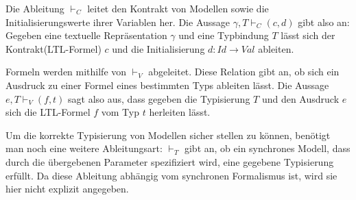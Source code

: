 Die Ableitung $\vdash_C$ leitet den Kontrakt von Modellen sowie die Initialisierungswerte ihrer Variablen her.
Die Aussage $\gamma,T\vdash_C (c,d)$ gibt also an: Gegeben eine textuelle Repräsentation $\gamma$ und eine Typbindung $T$ lässt sich der Kontrakt(LTL-Formel) $c$ und die Initialisierung $d : \mathit{Id}\rightarrow \mathit{Val}$ ableiten.

Formeln werden mithilfe von $\vdash_V$ abgeleitet.
Diese Relation gibt an, ob sich ein Ausdruck zu einer Formel eines bestimmten Typs ableiten lässt.
Die Aussage $e,T\vdash_V (f,t)$ sagt also aus, dass gegeben die Typisierung $T$ und den Ausdruck $e$ sich die LTL-Formel $f$ vom Typ $t$ herleiten lässt.

Um die korrekte Typisierung von Modellen sicher stellen zu können, benötigt man noch eine weitere Ableitungsart:
$\vdash_T$ gibt an, ob ein synchrones Modell, dass durch die übergebenen Parameter spezifiziert wird, eine gegebene Typisierung erfüllt.
Da diese Ableitung abhängig vom synchronen Formalismus ist, wird sie hier nicht explizit angegeben.

